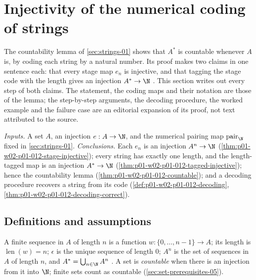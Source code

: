\section{Injectivity of the numerical coding of strings}
\label{sec:p01-w02-p01-012-string-coding}

The countability lemma of \cref{sec:strings-01} shows that \(A^*\) is
countable whenever \(A\) is, by coding each string by a natural number. Its
proof makes two claims in one sentence each: that every stage map \(e_n\) is
injective, and that tagging the stage code with the length gives an injection
\(A^*\to\N\) \cite[ch.~``Finite Strings, Induction, and Recursion'',
sec.~``Finite sequences and strings'', lemma ``Countability of finite
strings'']{FrozenFormalLogicStringCoding}. This section writes out every step
of both claims. The statement, the coding maps and their notation are those
of the lemma; the step-by-step arguments, the decoding procedure, the worked
example and the failure case are an editorial expansion of its proof, not text
attributed to the source.

\emph{Inputs.} A set \(A\), an injection \(e:A\to\N\), and the numerical
pairing map \(\operatorname{pair}_{\N}\) fixed in \cref{sec:strings-01}.
\emph{Conclusions.} Each \(e_n\) is an injection \(A^n\to\N\)
(\cref{thm:p01-w02-p01-012-stage-injective}); every string has exactly one
length, and the length-tagged map is an injection \(A^*\to\N\)
(\cref{thm:p01-w02-p01-012-tagged-injective}); hence the countability lemma
(\cref{thm:p01-w02-p01-012-countable}); and a decoding procedure recovers a
string from its code (\cref{def:p01-w02-p01-012-decoding},
\cref{thm:p01-w02-p01-012-decoding-correct}).

\subsection{Definitions and assumptions}
\label{sec:p01-w02-p01-012-assumptions}

A finite sequence in \(A\) of length \(n\) is a function
\(w:\{0,\ldots,n-1\}\to A\); its length is \(\operatorname{len}(w)=n\);
\(\epsilon\) is the unique sequence of length \(0\); \(A^n\) is the set of
sequences in \(A\) of length \(n\), and \(A^*=\bigcup_{n\in\N}A^n\)
\cite[ch.~``Finite Strings, Induction, and Recursion'', definitions ``Finite
sequence'' and ``String'']{FrozenFormalLogicStringCoding}. A set is
\emph{countable} when there is an injection from it into \(\N\); finite sets
count as countable (\cref{sec:set-prerequisites-05}).

